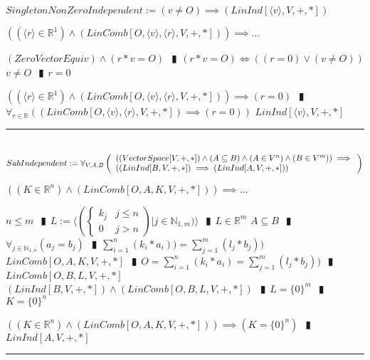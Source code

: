 \documentclass{book}
\newcommand{\abr}{:=}
\newcommand{\pipe}{$\phantom{(}\vrectangleblack\phantom{)}$}
\newcommand{\pr}[1]{\left(#1\right)}
\begin{document}
$SingletonNonZeroIndependent \abr (v \neq O) \implies (LinInd[\langle v \rangle, V, +, *])$
\begin{enumerate}
  \lit $\pr{(\langle r \rangle \in \mathbb{R}^1) \land (LinComb[O, \langle v \rangle , \langle r \rangle, V, +, *])} \implies \ldots$
  \begin{enumerate}
    \lit $(ZeroVectorEquiv) \land (r * v = O)$ \pipe $(r * v = O) \iff \pr{(r = 0) \lor (v \neq O)}$
    \lit $v \neq O$ \pipe $r = 0$
  \end{enumerate}
  \lit $\pr{(\langle r \rangle \in \mathbb{R}^1) \land (LinComb[O, \langle v \rangle , \langle r \rangle, V, +, *])} \implies (r = 0)$ \pipe $\forall_{r \in \mathbb{R}}\pr{(LinComb[O, \langle v \rangle, \langle r \rangle, V, +, *]) \implies (r = 0)}$
  \lit $LinInd[\langle v \rangle, V, +, *]$
\end{enumerate} \vspace{.75mm} \hrule \vspace{.75mm} \ \\ 

$SubIndependent \abr \forall_{V, A, B}\left(\begin{array}{ll}
  \pr{(VectorSpace[V, +, *]) \land (A \subseteq B) \land (A \in V^n) \land (B \in V^m)} \hfill \implies \hfill \\
  \pr{(LinInd[B, V, +, *]) \implies (LinInd[A, V, +, *])}
\end{array}\right)$
\begin{enumerate}
  \lit $\pr{(K \in \mathbb{R}^n) \land (LinComb[O, A, K, V, +, *])} \implies \ldots$
  \begin{enumerate}
    \lit $n \leq m$ \pipe $L \abr \langle \left(\begin{cases} 
      k_j & j \leq n \\
      0 & j > n 
    \end{cases}\right) | j \in \mathbb{N}_{1, m}) \rangle$ \pipe $L \in \mathbb{R}^m$
    \lit $A \subseteq B$ \pipe $\forall_{j \in \mathbb{N}_{1, n}}(a_j = b_j)$ \pipe $\sum_{i = 1}^{n}(k_i * a_i)) = \sum_{j = 1}^{m}(l_j * b_j))$
    \lit $LinComb[O, A, K, V, +, *]$ \pipe $O = \sum_{i = 1}^{n}(k_i * a_i) = \sum_{j = 1}^{m}(l_j * b_j))$ \pipe $LinComb[O, B, L, V, +, *]$
    \lit $(LinInd[B, V, +, *]) \land (LinComb[O, B, L, V, +, *])$ \pipe $L = \{0\}^m$ \pipe $K = \{0\}^n$ 
  \end{enumerate}
  \lit $\pr{(K \in \mathbb{R}^n) \land (LinComb[O, A, K, V, +, *])} \implies (K = \{0\}^n)$ \pipe $LinInd[A, V, +, *]$
\end{enumerate} \vspace{.75mm} \hrule \vspace{.75mm} \ \\ 
\end{document}
